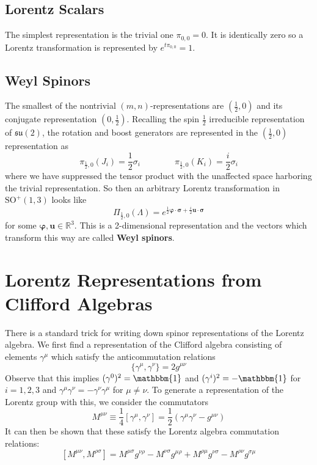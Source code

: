 \documentclass[onecolumn]{gwclass}
\def \*#1{\boldsymbol{#1}}
\renewcommand{\t}[1]{\text{#1}}
\begin{document}
\subsection{Lorentz Scalars}
The simplest representation is the trivial one $\pi_{0,0}=0$. It is identically zero so a Lorentz transformation is represented by $e^{t\pi_{0,0}}=1$.

\subsection{Weyl Spinors}
The smallest of the nontrivial $(m,n)$-representations are $(\frac{1}{2},0)$ and its conjugate representation $(0,\frac{1}{2})$. Recalling the spin $\frac{1}{2}$ irreducible representation of $\mathfrak{su}(2)$, the rotation and boost generators are represented in the $(\frac{1}{2},0)$ representation as
$$ \pi_{\frac{1}{2},0}(J_i) = \frac{1}{2}\sigma_i \qquad\qquad \pi_{\frac{1}{2},0}(K_i) = \frac{i}{2}\sigma_i $$
where we have suppressed the tensor product with the unaffected space harboring the trivial representation. So then an arbitrary Lorentz transformation in $\t{SO}^+(1,3)$ looks like
$$ \Pi_{\frac{1}{2},0}(\Lambda) = e^{\frac{1}{2}\*\varphi\cdot\*\sigma + \frac{i}{2}\*u\cdot\*\sigma} $$
for some $\*\varphi, \*u \in\mathbb{R}^3$. This is a 2-dimensional representation and the vectors which transform this way are called \textbf{Weyl spinors}.

\section{Lorentz Representations from Clifford Algebras}
There is a standard trick for writing down spinor representations of the Lorentz algebra. We first find a representation of the Clifford algebra consisting of elements $\gamma^\mu$ which satisfy the anticommutation relations
$$ \{ \gamma^\mu, \gamma^\nu \} = 2g^{\mu\nu} $$
Observe that this implies $(\gamma^0)^2=\mathbbm{1}$ and $(\gamma^i)^2=-\mathbbm{1}$ for $i=1,2,3$ and $\gamma^\mu\gamma^\nu=-\gamma^\nu\gamma^\mu$ for $\mu\neq \nu$. To generate a representation of the Lorentz group with this, we\textbf{} consider the commutators
$$ M^{\mu\nu} \equiv \frac{1}{4}[\gamma^\mu, \gamma^\nu]  = \frac{1}{2}(\gamma^\mu\gamma^\nu -  g^{\mu\nu})  $$
It can then be shown that these satisfy the Lorentz algebra commutation relations:
$$ [M^{\mu\nu}, M^{\rho\sigma}] = M^{\mu\sigma}g^{\nu\rho} - M^{\nu\sigma}g^{\mu\rho} + M^{\rho\mu}g^{\nu\sigma} - M^{\rho\nu}g^{\sigma\mu} $$ 
\end{document}
